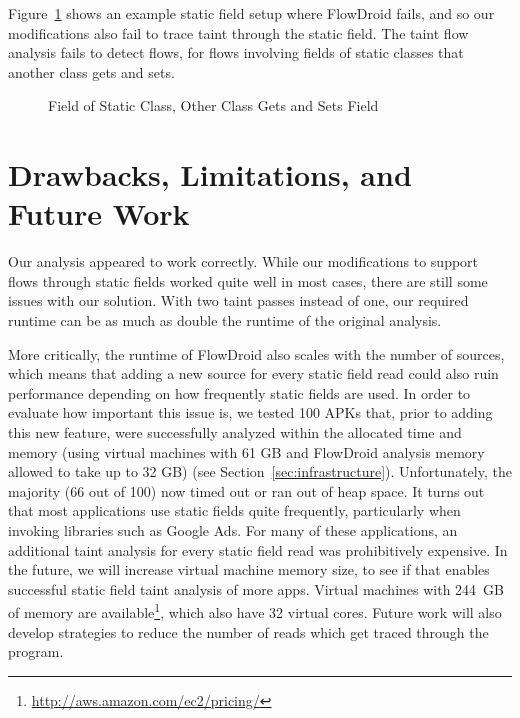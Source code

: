 Figure~\ref{fig:staticAnalysisProblem} shows an example static field setup where FlowDroid fails, and so our modifications also fail to trace taint through the static field.  The taint flow analysis fails to detect flows, for flows involving fields of static classes that another class gets and sets.

\begin{figure}
\begin{framed}
\begin{center}
\begin{minipage}{0.85\textwidth}

\end{minipage}
\end{center}
\caption{Field of Static Class, Other Class Gets and Sets Field}
\label{fig:staticAnalysisProblem}
\end{framed}
\end{figure}


\section{Drawbacks, Limitations, and Future Work}

Our analysis appeared to work correctly. While our modifications to support flows through static fields worked quite well in most cases, there are still some issues with our solution. With two taint passes instead of one, our required runtime can be as much as double the runtime of the original analysis. 

More critically, the runtime of FlowDroid also scales with the number of sources, which means that adding a new source for every static field read could also ruin performance depending on how frequently static fields are used. In order to evaluate how important this issue is, we tested 100 APKs that, prior to adding this new feature, were successfully analyzed within the allocated time and memory (using virtual machines with 61 GB and FlowDroid analysis memory allowed to take up to 32 GB) (see Section~\ref{sec:infrastructure}). Unfortunately, the majority (66 out of 100) now timed out or ran out of heap space. It turns out that most applications use static fields quite frequently, particularly when invoking libraries such as Google Ads. For many of these applications, an additional taint analysis for every static field read was prohibitively expensive. In the future, we will increase virtual machine memory size, to see if that enables successful static field taint analysis of more apps. Virtual machines with 244~GB of memory are available\footnote{\url{http://aws.amazon.com/ec2/pricing/}}, which also have 32 virtual cores. Future work will also develop strategies to reduce the number of reads which get traced through the program. 


